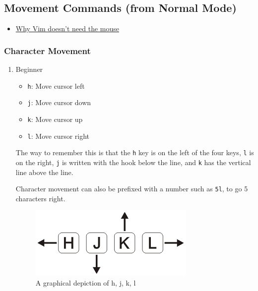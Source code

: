 \documentclass[11pt]{article}
\begin{document}
\subsection{Movement Commands (from Normal Mode)}
\label{sec:orge1e3f37}

\begin{itemize}
\item \href{https://www.youtube.com/watch?v=tQCRVkSFFEc}{Why Vim doesn't need the mouse}
\end{itemize}
\subsubsection{Character Movement}
\label{sec:orgeca1c93}
\begin{enumerate}
\item Beginner
\label{sec:org3c0a97d}
\begin{itemize}
\item \texttt{h}: Move cursor left
\item \texttt{j}: Move cursor down
\item \texttt{k}: Move cursor up
\item \texttt{l}: Move cursor right
\end{itemize}

The way to remember this is that the \texttt{h} key is on the left of the four keys,
\texttt{l} is on the right, \texttt{j} is written with the hook below the line, and \texttt{k} has
the vertical line above the line.

Character movement can also be prefixed with a number such as \texttt{5l}, to go 5
characters right.

\begin{figure}[htbp]
\centering
\includegraphics[width=.9\linewidth]{./hjkl.png}
\caption{\label{fig:orga808ca4}
A graphical depiction of h, j, k, l}
\end{figure}
\end{enumerate}
\end{document}
